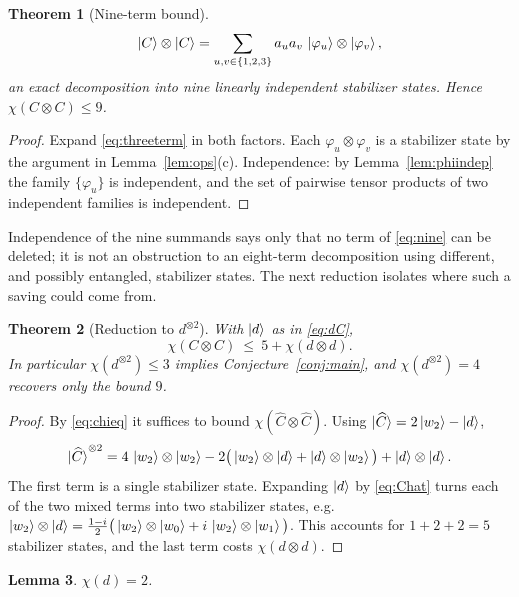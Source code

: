 \documentclass[11pt]{article}
\theoremstyle{plain}
\newtheorem{theorem}{Theorem}[section]
\newtheorem{lemma}[theorem]{Lemma}
\theoremstyle{definition}
\begin{document}
\begin{theorem}[Nine-term bound]\label{thm:nine}
\begin{equation}\label{eq:nine}
\ket C\otimes\ket C=\sum_{u,v\in\{1,2,3\}}a_ua_v\,\ket{\varphi_u}\otimes\ket{\varphi_v},
\end{equation}
an exact decomposition into nine linearly independent stabilizer states. Hence
$\chi(C\otimes C)\le9$.
\end{theorem}

\begin{proof}
Expand \eqref{eq:threeterm} in both factors. Each $\varphi_u\otimes\varphi_v$ is a
stabilizer state by the argument in Lemma~\ref{lem:ops}(c). Independence: by
Lemma~\ref{lem:phiindep} the family $\{\varphi_u\}$ is independent, and the set of
pairwise tensor products of two independent families is independent.
\end{proof}

Independence of the nine summands says only that no term of \eqref{eq:nine} can be
deleted; it is not an obstruction to an eight-term decomposition using different, and
possibly entangled, stabilizer states. The next reduction isolates where such a saving
could come from.

\begin{theorem}[Reduction to $d^{\otimes2}$]\label{thm:reduce}
With $\ket d$ as in \eqref{eq:dC},
\begin{equation}\label{eq:reduce}
\chi(C\otimes C)\ \le\ 5+\chi(d\otimes d).
\end{equation}
In particular $\chi(d^{\otimes2})\le3$ implies Conjecture~\ref{conj:main}, and
$\chi(d^{\otimes2})=4$ recovers only the bound $9$.
\end{theorem}

\begin{proof}
By \eqref{eq:chieq} it suffices to bound $\chi(\widehat C\otimes\widehat C)$. Using
$\ket{\widehat C}=2\ket{w_2}-\ket d$,
\[
\ket{\widehat C}^{\otimes2}
=4\,\ket{w_2}\otimes\ket{w_2}
-2\big(\ket{w_2}\otimes\ket d+\ket d\otimes\ket{w_2}\big)
+\ket d\otimes\ket d .
\]
The first term is a single stabilizer state. Expanding $\ket d$ by \eqref{eq:Chat}
turns each of the two mixed terms into two stabilizer states, e.g.
$\ket{w_2}\otimes\ket d=\frac{1-i}2\big(\ket{w_2}\otimes\ket{w_0}
+i\,\ket{w_2}\otimes\ket{w_1}\big)$. This accounts for $1+2+2=5$ stabilizer states,
and the last term costs $\chi(d\otimes d)$.
\end{proof}

\begin{lemma}\label{lem:chid}
$\chi(d)=2$.
\end{lemma}
\end{document}
